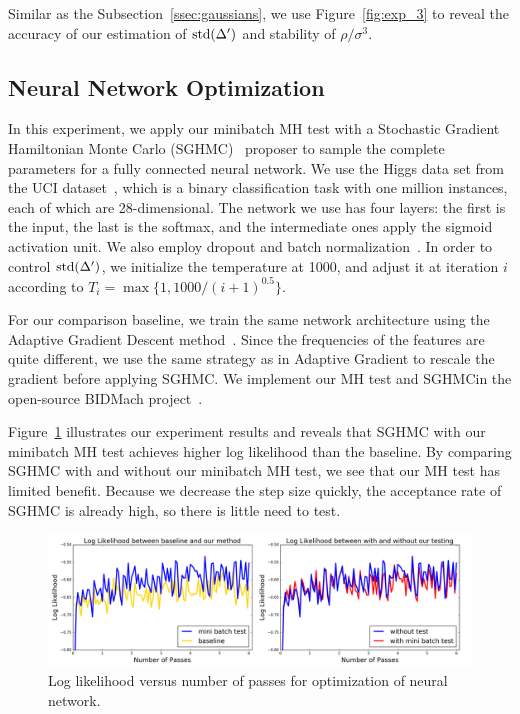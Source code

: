 \documentclass{article}
\begin{document}
Similar as the Subsection~\ref{ssec:gaussians}, we use Figure~\ref{fig:exp_3} to reveal the accuracy of our estimation of ${\rm std}(\Delta')$ and stability of $\rho/\sigma^3$.


\subsection{Neural Network Optimization}\label{ssec:nets}

In this experiment, we apply our minibatch MH test with a Stochastic Gradient Hamiltonian
Monte Carlo (SGHMC)~\cite{sghmc_2014} proposer to sample the complete parameters for a fully
connected neural network. We use the Higgs data set from the UCI dataset~\cite{Lichman:2013}, which
is a binary classification task with one million instances, each of which are 28-dimensional. The
network we use has four layers: the first is the input, the last is the softmax, and the
intermediate ones apply the sigmoid activation unit.  We also employ dropout and batch
normalization~\cite{icml2015_ioffe15}.  In order to control ${\rm std}(\Delta')$, we initialize the
temperature at 1000, and adjust it at iteration $i$ according to $T_i = \max\{1,
1000/(i+1)^{0.5}\}$.

For our comparison baseline, we train the same network architecture using the Adaptive Gradient
Descent method~\cite{adapGrad}. Since the frequencies of the features are quite different, we use
the same strategy as in Adaptive Gradient to rescale the gradient before applying SGHMC. We
implement our MH test and SGHMCin the open-source BIDMach project~\cite{canny2013bidmach}.  

Figure~\ref{fig:nnet_fig} illustrates our experiment results and reveals that SGHMC with our
minibatch MH test achieves higher log likelihood than the baseline. By comparing SGHMC with and
without our minibatch MH test, we see that our MH test has limited benefit. Because we decrease the
step size quickly, the acceptance rate of SGHMC is already high, so there is little need to test.

\begin{figure}[t]
    \centering
    \includegraphics[width=1\linewidth]{exp3}
    \caption{Log likelihood versus number of passes for optimization of neural network.}
    \label{fig:nnet_fig}
    \vspace{-10pt}
\end{figure}
\end{document}
